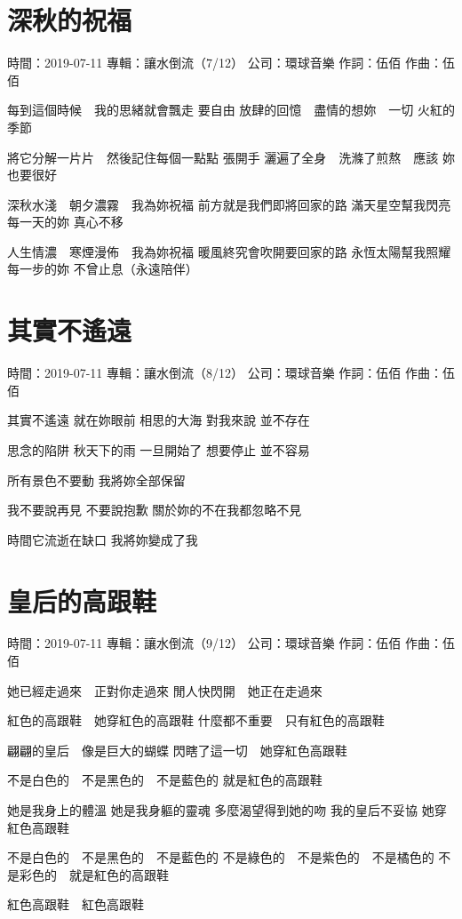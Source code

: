 \documentclass[UTF8,a4paper,oneside,twocolumn,12pt]{ctexbook}
\newcommand{\infopair}[2]{\textbullet #1：#2}
\newcommand{\zc}[1][伍佰]{\infopair{作詞}{#1}}
\newcommand{\zq}[1][伍佰]{\infopair{作曲}{#1}}
\newcommand{\zj}[1]{\infopair{專輯}{#1}}
\newcommand{\sj}[1]{\infopair{時間}{#1}}
\newcommand{\gs}[1]{\infopair{公司}{#1}}
\newenvironment{info}{\begin{flushleft}\kaishu
	}
	{\end{flushleft}\normalsize\yahei\par}
\newenvironment{lyric}{
	}
{}
\begin{document}
\section{深秋的祝福}
\begin{info}
	\sj{2019-07-11}
	\zj{讓水倒流（7/12）}
	\gs{環球音樂}
	\zc
	\zq
\end{info}
\begin{lyric}
	每到這個時候　我的思緒就會飄走
	要自由
	放肆的回憶　盡情的想妳　一切
	火紅的季節

	將它分解一片片　然後記住每個一點點
	張開手
	灑遍了全身　洗滌了煎熬　應該
	妳也要很好

	深秋水淺　朝夕濃霧　我為妳祝福
	前方就是我們即將回家的路
	滿天星空幫我閃亮每一天的妳
	真心不移

	人生情濃　寒煙漫佈　我為妳祝福
	暖風終究會吹開要回家的路
	永恆太陽幫我照耀每一步的妳
	不曾止息（永遠陪伴）
\end{lyric}

\section{其實不遙遠}
\begin{info}
	\sj{2019-07-11}
	\zj{讓水倒流（8/12）}
	\gs{環球音樂}
	\zc
	\zq
\end{info}
\begin{lyric}
	其實不遙遠
	就在妳眼前
	相思的大海
	對我來說 並不存在

	思念的陷阱
	秋天下的雨
	一旦開始了
	想要停止 並不容易

	所有景色不要動
	我將妳全部保留

	我不要說再見 不要說抱歉
	關於妳的不在我都忽略不見

	時間它流逝在缺口
	我將妳變成了我
\end{lyric}

\section{皇后的高跟鞋}
\begin{info}
	\sj{2019-07-11}
	\zj{讓水倒流（9/12）}
	\gs{環球音樂}
	\zc
	\zq
\end{info}
\begin{lyric}
	她已經走過來　正對你走過來
	閒人快閃開　她正在走過來

	紅色的高跟鞋　她穿紅色的高跟鞋
	什麼都不重要　只有紅色的高跟鞋

	翩翩的皇后　像是巨大的蝴蝶
	閃瞎了這一切　她穿紅色高跟鞋

	不是白色的　不是黑色的　不是藍色的
	就是紅色的高跟鞋

	她是我身上的體溫
	她是我身軀的靈魂
	多麼渴望得到她的吻
	我的皇后不妥協
	她穿紅色高跟鞋

	不是白色的　不是黑色的　不是藍色的
	不是綠色的　不是紫色的　不是橘色的
	不是彩色的　就是紅色的高跟鞋

	紅色高跟鞋　紅色高跟鞋
\end{lyric}
\end{document}
